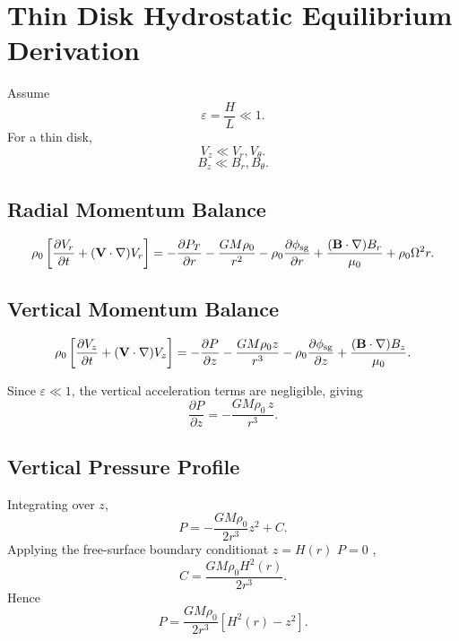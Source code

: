 \documentclass[11pt]{article}
\begin{document}
\section*{Thin Disk Hydrostatic Equilibrium Derivation}

Assume
\begin{equation}
\varepsilon=\frac{H}{L}\ll1.
\end{equation}
For a thin disk,
\begin{equation}
V_z \ll V_r,V_\theta.
\end{equation}
\begin{equation}
B_z \ll B_r,B_\theta.
\end{equation}
\subsection*{Radial Momentum Balance}

\begin{equation}
\rho_0
\left[
\frac{\partial V_r}{\partial t}
+(\mathbf{V}\cdot\nabla)V_r
\right]
=
-\frac{\partial P_T}{\partial r}
-\frac{GM\rho_0}{r^2}
-\rho_0\frac{\partial\phi_{\rm sg}}{\partial r}
+\frac{(\mathbf{B}\cdot\nabla)B_r}{\mu_0}
+\rho_0\Omega^2 r.
\end{equation}

\subsection*{Vertical Momentum Balance}

\begin{equation}
\rho_0
\left[
\frac{\partial V_z}{\partial t}
+(\mathbf{V}\cdot\nabla)V_z
\right]
=
-\frac{\partial P}{\partial z}
-\frac{GM\rho_0 z}{r^3}
-\rho_0\frac{\partial\phi_{\rm sg}}{\partial z}
+\frac{(\mathbf{B}\cdot\nabla)B_z}{\mu_0}.
\end{equation}

Since $\varepsilon\ll1$, the vertical acceleration terms are negligible, giving
\begin{equation}
\frac{\partial P}{\partial z}
=
-\frac{GM\rho_0\, z}{r^3}.
\end{equation}

\subsection*{Vertical Pressure Profile}

Integrating over $z$,
\begin{equation}
P = -\frac{GM\rho_0}{2r^3}z^2 + C.
\end{equation}
Applying the free-surface boundary conditionat $z=H(r)$ $P=0$ ,
\begin{equation}
C = \frac{GM\rho_0 H^2(r)}{2r^3}.
\end{equation}
Hence
\begin{equation}
\boxed{
P = \frac{GM\rho_0}{2r^3}\left[H^2(r)-z^2\right].
}
\end{equation}
\end{document}
